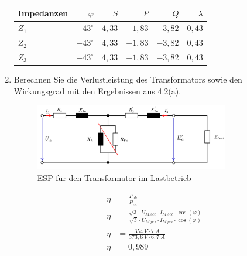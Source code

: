 \begin{enumerate}[label=\alph*)]
\begin{table}[h!]
		      \centering
		      \begin{tabular}{lrrrrr}
			      \hline
			      Impedanzen & $\varphi$     & $S$    & $P$      & $Q$     & $\lambda$ \\ \hline
			      $Z_1$      & $-43^\circ$   & $4,33$ & $-1,83$  & $-3,82$ & $0,43$    \\
			      $Z_2$      & $-43^\circ$   & $4,33$ & $-1,83 $ & $-3,82$ & $0,43$    \\
			      $Z_3$      & $-43^\circ  $ & $4,33$ & $-1,83$  & $-3,82$ & $0,43$    \\ \hline
		      \end{tabular}
	      \end{table}

	\item Berechnen Sie die Verlustleistung des Transformators sowie den Wirkungsgrad mit
	      den Ergebnissen aus 4.2(a).
	      \begin{figure}[h!]
		      \begin{center}
			      \includegraphics[width=0.8\textwidth]{img/4.2.2.1}
		      \end{center}
		      \caption{ESP für den Transformator im Lastbetrieb}\label{img:4.2.2.1}
	      \end{figure}

		  
	      \begin{align*}
		      \eta & = \frac{P_{ab}}{P_{zu}}                                                                                                       \\
		      \eta & = \frac{\sqrt{3}\cdot U_{M.sec}\cdot I_{M.sec}\cdot \cos(\varphi)}{\sqrt{3}\cdot U_{M.pri}\cdot I_{M.pri}\cdot \cos(\varphi)} \\
		      \eta & = \frac{354\ V\cdot 7\ A}{373,6\ V\cdot 6,7\ A}                                                                               \\
		      \eta & = 0,989
	      \end{align*}


\end{enumerate}
